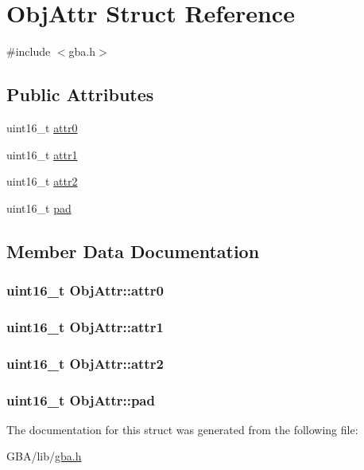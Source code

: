 \hypertarget{struct_obj_attr}{\section{Obj\-Attr Struct Reference}
\label{struct_obj_attr}
}


{\ttfamily \#include $<$gba.\-h$>$}

\subsection*{Public Attributes}
\begin{DoxyCompactItemize}
\item 
uint16\-\_\-t \hyperlink{struct_obj_attr_ab358a507b0ad6429e717941068d64f76}{attr0}
\item 
uint16\-\_\-t \hyperlink{struct_obj_attr_a86d659f745500f46f239d21a24b6ff3c}{attr1}
\item 
uint16\-\_\-t \hyperlink{struct_obj_attr_a43d6d720a9f684dbb0c23318ea9ce2ea}{attr2}
\item 
uint16\-\_\-t \hyperlink{struct_obj_attr_a4ce5fb46cf75eea5d97d939afe090802}{pad}
\end{DoxyCompactItemize}


\subsection{Member Data Documentation}
\hypertarget{struct_obj_attr_ab358a507b0ad6429e717941068d64f76}{
\subsubsection[{attr0}]{\setlength{\rightskip}{0pt plus 5cm}uint16\-\_\-t {\bf Obj\-Attr\-::attr0}}}\label{struct_obj_attr_ab358a507b0ad6429e717941068d64f76}
\hypertarget{struct_obj_attr_a86d659f745500f46f239d21a24b6ff3c}{
\subsubsection[{attr1}]{\setlength{\rightskip}{0pt plus 5cm}uint16\-\_\-t {\bf Obj\-Attr\-::attr1}}}\label{struct_obj_attr_a86d659f745500f46f239d21a24b6ff3c}
\hypertarget{struct_obj_attr_a43d6d720a9f684dbb0c23318ea9ce2ea}{
\subsubsection[{attr2}]{\setlength{\rightskip}{0pt plus 5cm}uint16\-\_\-t {\bf Obj\-Attr\-::attr2}}}\label{struct_obj_attr_a43d6d720a9f684dbb0c23318ea9ce2ea}
\hypertarget{struct_obj_attr_a4ce5fb46cf75eea5d97d939afe090802}{
\subsubsection[{pad}]{\setlength{\rightskip}{0pt plus 5cm}uint16\-\_\-t {\bf Obj\-Attr\-::pad}}}\label{struct_obj_attr_a4ce5fb46cf75eea5d97d939afe090802}


The documentation for this struct was generated from the following file\-:\begin{DoxyCompactItemize}
\item 
G\-B\-A/lib/\hyperlink{gba_8h}{gba.\-h}\end{DoxyCompactItemize}
